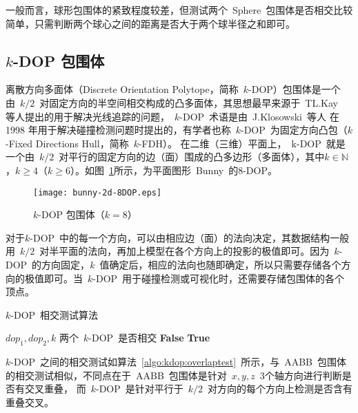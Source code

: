 一般而言，球形包围体的紧致程度较差，但测试两个~Sphere~包围体是否相交比较简单，只需判断两个球心之间的距离是否大于两个球半径之和即可。

\subsection{$k$-DOP 包围体}

离散方向多面体（Discrete Orientation Polytope，简称~$k$-DOP）包围体是一个由~$k/2$~对固定方向的半空间相交构成的凸多面体，其思想最早来源于~TL.Kay~\cite{Kay1986Ray}
等人提出的用于解决光线追踪的问题，~$k$-DOP~术语是由~J.Klosowski~等人\cite{klosowski1998efficient}
在1998 年用于解决碰撞检测问题时提出的，有学者也称~$k$-DOP~为固定方向凸包（$k$-Fixed
Directions Hull，简称~$k$-FDH）\cite{weiyingmei2001}。
在二维（三维）平面上，~k-DOP~就是一个由~$k/2$~对平行的固定方向的边（面）围成的凸多边形（多面体），其中$k\in\mathbb{N}$，$k\geq4$（$k\geq6$）。如图~\ref{fig:8dop-bunny}所示，为平面图形~Bunny~的$8$-DOP。
\begin{figure}[htbp] %
  \centering
  \texttt{[image: bunny-2d-8DOP.eps]}
  \caption{$k$-DOP 包围体（$k=8$）}
  \label{fig:8dop-bunny}
\end{figure}

对于$k$-DOP~中的每一个方向，可以由相应边（面）的法向决定，其数据结构一般用~$k/2$~对半平面的法向，再加上模型在各个方向上的投影的极值即可。因为~$k$-DOP~的方向固定，$k$~值确定后，相应的法向也随即确定，所以只需要存储各个方向的极值即可。当~$k$-DOP~用于碰撞检测或可视化时，还需要存储包围体的各个顶点。

\begin{algorithm}
\caption{$k$-DOP~相交测试算法}
\small
\label{algo:kdop:overlaptest}
\begin{algorithmic}[1]
\Require
$dop_1, dop_2, k$ 
\Ensure
两个~$k$-DOP~是否相交
          \State \Return \textbf{False} 
      \EndIf
  \EndFor
  \State \Return \textbf{True} 
\EndFunction
\end{algorithmic}
\end{algorithm}

$k$-DOP~之间的相交测试如算法~\ref{algo:kdop:overlaptest}~所示\cite{ericson2005real}，与~AABB~包围体的相交测试相似，不同点在于~AABB~包围体是针对~$x,y,z$~3个轴方向进行判断是否有交叉重叠，
而~$k$-DOP~是针对平行于~$k/2$~对方向的每个方向上检测是否含有重叠交叉。

